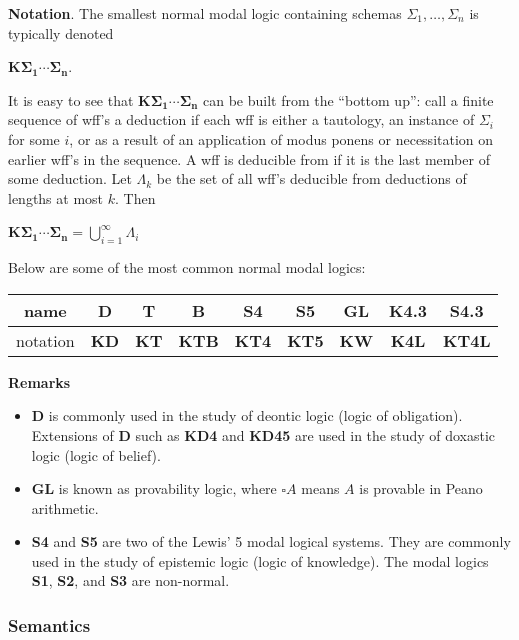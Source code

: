 \documentclass[12pt]{article}
\begin{document}
\textbf{Notation}.  The smallest normal modal logic containing schemas $\Sigma_1,\ldots, \Sigma_n$ is typically denoted 
\begin{center}
\textbf{K}$\mathbf{\Sigma_1 \cdots \Sigma_n}$.  
\end{center}
It is easy to see that \textbf{K}$\mathbf{\Sigma_1 \cdots \Sigma_n}$ can be built from the ``bottom up'': call a finite sequence of wff's a deduction if each wff is either a tautology, an instance of $\Sigma_i$ for some $i$, or as a result of an application of modus ponens or necessitation on earlier wff's in the sequence.  A wff is deducible from if it is the last member of some deduction.  Let $\Lambda_k$ be the set of all wff's deducible from deductions of lengths at most $k$.  Then 
\begin{center}
\textbf{K}$\mathbf{\Sigma_1 \cdots \Sigma_n} = \bigcup_{i=1}^{\infty} \Lambda_i$
\end{center}

Below are some of the most common normal modal logics:
\begin{center}
\begin{tabular}{|c||c|c|c|c|c|c|c|c|}
\hline
name & \textbf{D} & \textbf{T} & \textbf{B} & \textbf{S4} & \textbf{S5} & \textbf{GL} & \textbf{K4.3} & \textbf{S4.3} \\
\hline
notation & \textbf{KD} & \textbf{KT} & \textbf{KTB} & \textbf{KT4} & \textbf{KT5} & \textbf{KW} & \textbf{K4L} & \textbf{KT4L} \\
\hline
\end{tabular}
\end{center}
\textbf{Remarks}
\begin{itemize}
\item \textbf{D} is commonly used in the study of deontic logic (logic of obligation).  Extensions of \textbf{D} such as \textbf{KD4} and \textbf{KD45} are used in the study of doxastic logic (logic of belief).
\item \textbf{GL} is known as provability logic, where $\square A$ means $A$ is provable in Peano arithmetic.
\item \textbf{S4} and \textbf{S5} are two of the Lewis' 5 modal logical systems.  They are commonly used in the study of epistemic logic (logic of knowledge).  The modal logics \textbf{S1}, \textbf{S2}, and \textbf{S3} are non-normal.
\end{itemize}

\subsubsection*{Semantics}
\end{document}
